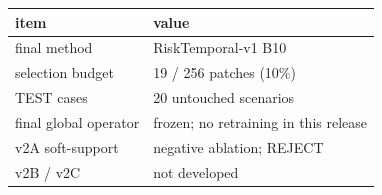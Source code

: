 \begin{tabular}{ll}
\toprule
item & value \\
\midrule
final method & RiskTemporal-v1 B10 \\
selection budget & 19 / 256 patches (10\%) \\
TEST cases & 20 untouched scenarios \\
final global operator & frozen; no retraining in this release \\
v2A soft-support & negative ablation; REJECT \\
v2B / v2C & not developed \\
\bottomrule
\end{tabular}
